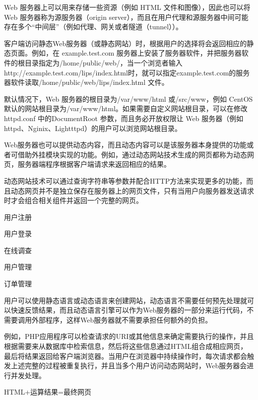 Web 服务器上可以用来存储一些资源（例如 HTML 文件和图像），因此也可以将 Web 服务器称为源服务器（origin server），而且在用户代理和源服务器中间可能存在多个“中间层”（例如代理、网关或者隧道（tunnel））。

客户端访问静态Web服务器（或静态网站）时，根据用户的选择将会返回相应的静态页面。例如，在 example.test.com 服务器上安装了服务器软件，并把服务器软件的根目录指定为/home/public/web/，当一个浏览者输入 http://example.test.com/lips/index.html时，就可以指定example.test.com的服务器软件读取/home/public/web/lips/index.html 文件。



默认情况下，Web 服务器的根目录为/var/www/html 或/src/www，例如 CentOS 默认的网站根目录为/var/www/html。如果需要自定义网站根目录，可以在修改 httpd.conf 中的DocumentRoot 参数，而且务必开放权限让 Web 服务器（例如 httpd、Nginix、Lightttpd）的用户可以浏览网站根目录。




Web服务器也可以提供动态内容，而且动态内容可以是该服务器本身提供的功能或者可借助外挂模块实现的功能。例如，通过动态网站技术生成的网页都称为动态网页，服务器端程序根据客户端请求来返回相应的结果。

动态网站技术可以通过查询字符串等参数并配合HTTP方法来实现更多的功能，而且动态网页并不是独立保存在服务器上的网页文件，只有当用户向服务器发送请求时才会组合相关组件并返回一个完整的网页。

\begin{compactitem}
\item 用户注册
\item 用户登录
\item 在线调查
\item 用户管理
\item 订单管理
\end{compactitem}

用户可以使用静态语言或动态语言来创建网站，动态语言不需要任何预先处理就可以快速反馈结果，而且动态语言引擎可以作为Web服务器的一部分来运行代码，不需要调用外部程序，这样Web服务器就不需要承担任何额外的负担。

例如，PHP应用程序可以检查请求的URI或其他信息来确定需要执行的操作，并且根据需要来从数据库中检索信息，然后将这些信息通过HTML组合成相应网页，最后将结果返回给客户端浏览器。当用户在浏览器中持续操作时，每次请求都会触发上述完整的过程被重复执行，并且当多个用户访问动态网站时，Web服务器会进行并发处理。

\begin{center}
HTML+运算结果=最终网页
\end{center}

